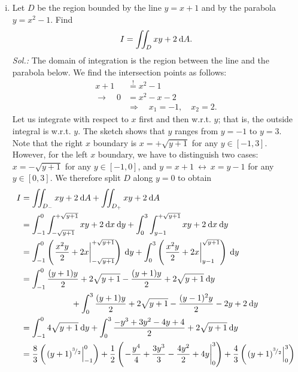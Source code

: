 \begin{example}
\label{expl:mult_int_2}
\begin{enumerate}[(i)]
	\item 
Let $D$ be the region bounded by the line $y=x+1$ and by the parabola $y=x^2-1$. Find
\[ I = \iint_D xy+2 \: \mathrm{d} A. \]
{\it Sol.:} 
The domain of integration is the region between the line and the parabola below. We find the intersection points as follows:
\begin{equation*}
\begin{split}
x + 1 & \stackrel{\text{!}}{=} x^2 - 1 \\
\rightarrow \quad 0 & = x^2-x-2 \\
& \Longrightarrow \quad x_1 = -1, \quad x_2 = 2.
\end{split}
\end{equation*}
Let us integrate with respect to $x$ first and then w.r.t. $y$; that is, the outside integral is w.r.t. $y$. The sketch shows that $y$ ranges from $y=-1$ to $y=3$. Note that the right $x$ boundary is $x=+\sqrt{y+1}$ for any $y\in[-1,3]$. However, for the left $x$ boundary, we have to distinguish two cases: $x=-\sqrt{y+1}$ for any $y\in[-1,0]$, and $y=x+1 \: \leftrightarrow \: x=y-1$ for any $y\in[0,3]$. We therefore split $D$ along $y=0$ to obtain
\begin{equation*}
\begin{split}
I & = \iint_{D_-} xy + 2 \: \d A + \iint_{D_+} xy + 2 \: \d A \\
& = \itgr{-1}{0}{\itgr{-\sqrt{y+1}}{+\sqrt{y+1}}{xy+2}{x}}{y}
  + \itgr{0}{3}{\itgr{y-1}{+\sqrt{y+1}}{xy+2}{x}}{y} \\
& = \itgr{-1}{0}{\left( \left. \frac{x^2y}{2}+2x \right|_{-\sqrt{y+1}}^{+\sqrt{y+1}} \right)}{y}
  + \itgr{0}{3}{\left( \left. \frac{x^2y}{2}+2x \right|_{y-1}^{\sqrt{y+1}} \right)}{y} \\
& = \itgr{-1}{0}{\frac{(y+1)y}{2}+2\sqrt{y+1}-\frac{(y+1)y}{2}+2\sqrt{y+1}}{y} \\  
  & \qquad \qquad \qquad 
  + \itgr{0}{3}{\frac{(y+1)y}{2}+2\sqrt{y+1}-\frac{(y-1)^2y}{2}-2y+2}{y} \\
& = \itgr{-1}{0}{4\sqrt{y+1}}{y} + \itgr{0}{3}{\frac{-y^3+3y^2-4y+4}{2}+2\sqrt{y+1}}{y} \\
& = \frac83 \left( \left. (y+1)^{\rfrac32} \right|_{-1}^{0} \right)
	+ \frac12 \left( \left. -\frac{y^4}{4}+\frac{3y^3}{3} 
		-\frac{4y^2}{2} + 4y \right|_0^3 \right)
	+ \frac43\left( \left. (y+1)^{\rfrac32} \right|_0^3 \right) \\

\end{split}
\end{equation*}
\end{enumerate}
\end{example}
